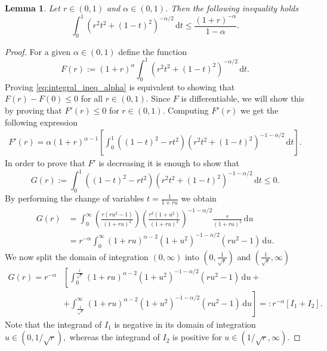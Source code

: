 \documentclass[10pt,leqno]{amsart}
\newcommand{\dd}{\, \mathrm{d}}
\numberwithin{Theorem}{section}
\newtheorem{Lemma}[Theorem]{Lemma}
\theoremstyle{definition}
\theoremstyle{remark}
\numberwithin{equation}{section}
\numberwithin{equation}{section}
\begin{document}
\begin{Lemma} \label{lm:integral_ineq_alpha}
    Let $r \in (0,1)$ and $\alpha \in (0,1)$. Then the following inequality holds
    \begin{equation} \label{eq:integral_ineq_alpha}
        \int_0^1 \left(r^2  t^2 + (1-t)^2\right)^{-\alpha/2} \dd t \leq \frac{(1+r)^{-\alpha}}{1-\alpha}.
    \end{equation}
\end{Lemma}
\begin{proof}
For a given $\alpha \in (0,1)$ define the function
    \[
    F(r):= (1+r)^{\alpha}\int_0^1 \left(r^2  t^2 + (1-t)^2\right)^{-\alpha/2} \dd t.
    \]
    Proving \eqref{eq:integral_ineq_alpha} is equivalent to showing that 
    $F(r)-F(0) \leq 0$ for all $r \in (0,1)$. Since $F$ is differentiable, we will show this by proving that $F'(r) \leq 0$ for $r \in (0,1)$.
    Computing $F'(r)$ we get the following expression
    \begin{align*}
        F'(r) = \alpha(1+r)^{\alpha-1} \left[ \int_0^1 \left((1-t)^2-r t^2 \right)\left(r^2t^2  + (1-t)^2\right)^{-1-\alpha/2} \dd t\right].
    \end{align*}
    In order to prove that $F'$ is decreasing it is enough to show that
    \[
    G(r):=\int_0^1 \left((1-t)^2-r t^2 \right)\left(r^2t^2  + (1-t)^2\right)^{-1-\alpha/2} \dd t \leq 0.
    \]
    By performing the change of variables $t=\frac{1}{1+ru}$ we obtain
    \begin{align*}
        G(r)&=\int_0^\infty \left(\frac{r(ru^2-1)}{(1+ru)^2}\right)\left(\frac{r^2(1+u^2)}{(1+ru)^2}\right)^{-1-\alpha/2} \frac{r}{(1+ru)^2} \dd u \\
        &= r^{-\alpha} \int_0^\infty (1+ru)^{\alpha-2} (1+u^2)^{-1-\alpha/2} (ru^2-1) \dd u.
    \end{align*}
    We now split the domain of integration $(0,\infty)$ into $\left( 0,\frac{1}{\sqrt{r}} \right)$ and $\left(\frac{1}{\sqrt{r}},\infty \right)$
    \begin{align*}
        G(r)=  r^{-\alpha} &\left[ \int_0^{\frac{1}{\sqrt{r}}} (1+ru)^{\alpha-2} (1+u^2)^{-1-\alpha/2} (ru^2-1) \dd u + \right. \\
        & \left. + \int_{\frac{1}{\sqrt{r}}}^{\infty} (1+ru)^{\alpha-2} (1+u^2)^{-1-\alpha/2} (ru^2-1) \dd u \right] =:r^{-\alpha} \left[ I_1 + I_2 \right].
    \end{align*}
    Note that the integrand of $I_1$ is negative in its domain of integration $u\in(0,1/\sqrt{r}),$ whereas the integrand of $I_2$ is positive for $u\in (1/\sqrt{r},\infty).$

\end{proof}
\end{document}
